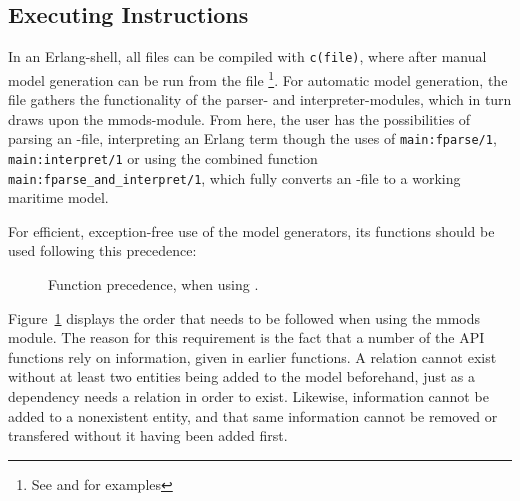 \subsection{Executing Instructions}
In an Erlang-shell, all files can be compiled with \lstinline{c(file)}, where after manual model generation can be run from the  file \footnote{See  and  for examples}.
For automatic model generation, the  file gathers the functionality of the parser- and interpreter-modules, which in turn draws upon the mmods-module. From here, the user has the possibilities of parsing an -file, interpreting an Erlang term though the uses of \lstinline{main:fparse/1}, \lstinline{main:interpret/1} or using the combined function \lstinline{main:fparse_and_interpret/1}, which fully converts an -file to a working maritime model.

For efficient, exception-free use of the model generators, its functions should be used following this precedence:

\begin{figure}[h]
  \centering
  \caption{Function precedence, when using .}
  \label{fig:mmodsPrec}
\end{figure}

Figure~\ref{fig:mmodsPrec} displays the order that needs to be followed when using the mmods module. The reason for this requirement is the fact that a number of the API functions rely on information, given in earlier functions.
A relation cannot exist without at least two entities being added to the model beforehand, just as a dependency needs a relation in order to exist. Likewise, information cannot be added to a nonexistent entity, and that same information cannot be removed or transfered without it having been added first.

